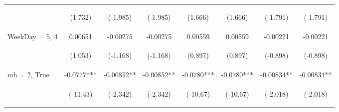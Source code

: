 \documentclass[]{article}
\begin{document}
\begin{center}
\begin{tabular}{lccccccc}
\vspace{4pt} & \begin{footnotesize}(1.732)\end{footnotesize} & \begin{footnotesize}(-1.985)\end{footnotesize} & \begin{footnotesize}(-1.985)\end{footnotesize} & \begin{footnotesize}(1.666)\end{footnotesize} & \begin{footnotesize}(1.666)\end{footnotesize} & \begin{footnotesize}(-1.791)\end{footnotesize} & \begin{footnotesize}(-1.791)\end{footnotesize} \\
WeekDay = 5, 4 & 0.00651 & -0.00275 & -0.00275 & 0.00559 & 0.00559 & -0.00221 & -0.00221 \\
\vspace{4pt} & \begin{footnotesize}(1.053)\end{footnotesize} & \begin{footnotesize}(-1.168)\end{footnotesize} & \begin{footnotesize}(-1.168)\end{footnotesize} & \begin{footnotesize}(0.897)\end{footnotesize} & \begin{footnotesize}(0.897)\end{footnotesize} & \begin{footnotesize}(-0.898)\end{footnotesize} & \begin{footnotesize}(-0.898)\end{footnotesize} \\
mh = 2, True & -0.0777*** & -0.00852** & -0.00852** & -0.0780*** & -0.0780*** & -0.00834** & -0.00834** \\
\vspace{4pt} & \begin{footnotesize}(-11.43)\end{footnotesize} & \begin{footnotesize}(-2.342)\end{footnotesize} & \begin{footnotesize}(-2.342)\end{footnotesize} & \begin{footnotesize}(-10.67)\end{footnotesize} & \begin{footnotesize}(-10.67)\end{footnotesize} & \begin{footnotesize}(-2.018)\end{footnotesize} & \begin{footnotesize}(-2.018)\end{footnotesize} \\

\end{tabular}
\end{center}
\end{document}
